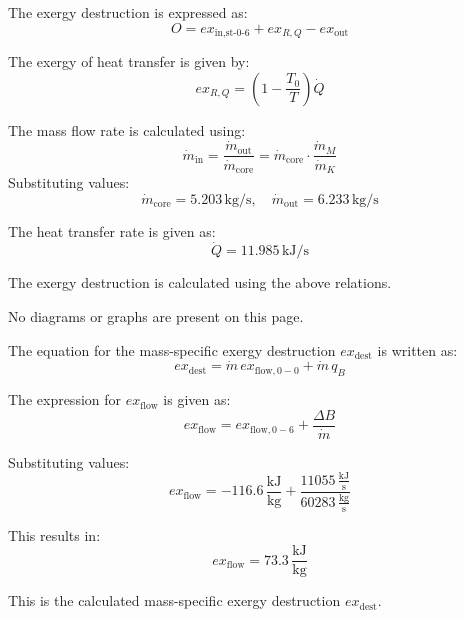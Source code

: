 The exergy destruction is expressed as:  
\[
O = ex_{\text{in,st-0-6}} + ex_{R,Q} - ex_{\text{out}}
\]  

The exergy of heat transfer is given by:  
\[
ex_{R,Q} = \left( 1 - \frac{T_0}{T} \right) \dot{Q}
\]  

The mass flow rate is calculated using:  
\[
\dot{m}_{\text{in}} = \frac{\dot{m}_{\text{out}}}{\dot{m}_{\text{core}}} = \dot{m}_{\text{core}} \cdot \frac{\dot{m}_M}{\dot{m}_K}
\]  
Substituting values:  
\[
\dot{m}_{\text{core}} = 5.203 \, \text{kg/s}, \quad \dot{m}_{\text{out}} = 6.233 \, \text{kg/s}
\]  

The heat transfer rate is given as:  
\[
\dot{Q} = 11.985 \, \text{kJ/s}
\]  

The exergy destruction is calculated using the above relations.  

No diagrams or graphs are present on this page.

The equation for the mass-specific exergy destruction \( ex_{\text{dest}} \) is written as:  
\[
ex_{\text{dest}} = \dot{m} \, ex_{\text{flow},0-0} + \dot{m} \, q_B
\]  

The expression for \( ex_{\text{flow}} \) is given as:  
\[
ex_{\text{flow}} = ex_{\text{flow},0-6} + \frac{\Delta B}{\dot{m}}
\]  

Substituting values:  
\[
ex_{\text{flow}} = -116.6 \, \frac{\text{kJ}}{\text{kg}} + \frac{11055 \, \frac{\text{kJ}}{\text{s}}}{60283 \, \frac{\text{kg}}{\text{s}}}
\]  

This results in:  
\[
ex_{\text{flow}} = 73.3 \, \frac{\text{kJ}}{\text{kg}}
\]  

This is the calculated mass-specific exergy destruction \( ex_{\text{dest}} \).